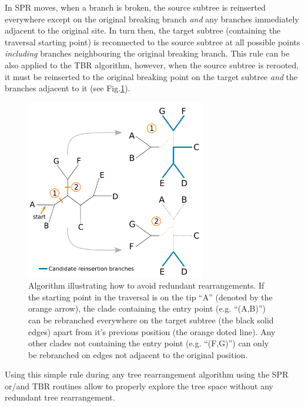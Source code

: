 \documentclass[12pt,letterpaper]{article}
\begin{document}
In SPR moves, when a branch is broken, the source subtree is reinserted everywhere except on the original breaking branch \textit{and} any branches immediately adjacent to the original site. 
In turn then, the target subtree (containing the traversal starting point) is reconnected to the source subtree at all possible points \textit{including} branches neighbouring the original breaking branch.
This rule can be also applied to the TBR algorithm, however, when the source subtree is rerooted, it must be reinserted to the original breaking point on the target subtree \textit{and} the branches adjacent to it (see Fig.\ref{Figure_Neighbor}).

\begin{figure}[!htbp]
\centering
   \includegraphics[width=0.7\textwidth]{Figure/Figure_Neighbour.pdf}
\caption{Algorithm illustrating how to avoid redundant rearrangements. If the starting point in the traversal is on the tip ``A'' (denoted by the orange arrow), the clade containing the entry point (e.g. ``(A,B)'') can be rebranched everywhere on the target subtree (the black solid edges) apart from it's previous position (the orange doted line). Any other clades not containing the entry point (e.g. ``(F,G)'') can only be rebranched on edges not adjacent to the original position.}
\label{Figure_Neighbor}
\end{figure}


Using this simple rule during any tree rearrangement algorithm using the SPR or/and TBR routines allow to properly explore the tree space \citep[i.e. the correct number of topologies are visited, following][]{allen2001subtree} without any redundant tree rearrangement.
\end{document}
